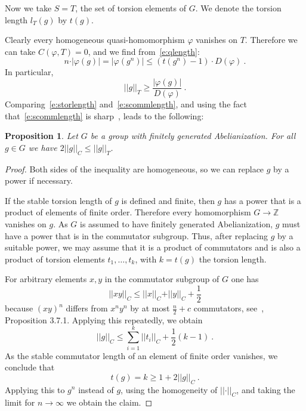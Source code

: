 \documentclass[12pt]{amsart}
\newtheorem{prop}[thm]{Proposition}
\theoremstyle{remark}
\theoremstyle{definition}
\newcommand{\Z}{\mathbb{ Z}}
\begin{document}
Now we take $S=T$, the set of torsion elements of $G$. We 
denote the torsion length $l_{T}(g)$ by $t(g)$.

Clearly every homogeneous quasi-homomorphism $\varphi$ vanishes on $T$. 
Therefore we can take $C(\varphi,T)=0$, and we find 
from~\eqref{e:qlength}:
\begin{equation}\label{e:torlength}
    n\cdot\vert\varphi(g)\vert = \vert\varphi(g^{n})\vert\leq 
    (t(g^{n})-1)\cdot 
    D(\varphi)\ .
    \end{equation}
In particular,
\begin{equation}\label{e:storlength}
   \vert\vert g\vert\vert_{T}
    \geq\frac{\vert\varphi(g)\vert}{D(\varphi)} \ .
    \end{equation}
Comparing~\eqref{e:storlength} and~\eqref{e:scommlength}, and using the 
fact that~\eqref{e:scommlength} is sharp~\cite{B}, leads to the 
following:
\begin{prop}\label{p:tor}
    Let $G$ be a group with finitely generated Abelianization. 
    For all $g\in G$ we have 
    $2\vert\vert g\vert\vert_{C}\leq\vert\vert g\vert\vert_{T}$.
    \end{prop}
\begin{proof}
    Both sides of the inequality are homogeneous, so we can replace 
    $g$ by a power if necessary.
    
    If the stable torsion length of $g$ is defined and finite, then 
    $g$ has a power that is a product of elements of finite order. 
    Therefore every homomorphism $G\rightarrow\Z$ vanishes on $g$.
    As $G$ is assumed to have finitely generated Abelianization,  
    $g$ must have a power that is in the commutator subgroup. Thus, 
    after replacing $g$ by a suitable power, we may assume that it is 
    a product of commutators and is also a product of torsion elements 
    $t_{1},\ldots,t_{k}$, with $k=t(g)$ the torsion length.
    
    For arbitrary elements $x,y$ in the commutator subgroup of $G$ one 
    has 
    $$
    \vert\vert xy\vert\vert_{C}\leq\vert\vert x\vert\vert_{C}+
    \vert\vert y\vert\vert_{C}+\frac{1}{2}
    $$
    because $(xy)^{n}$ differs from $x^{n}y^{n}$ by at most 
    $\frac{n}{2}+c$ commutators, see~\cite{B}, Proposition 3.7.1. 
    Applying this repeatedly, we obtain
    $$
    \vert\vert g\vert\vert_{C}\leq\sum_{i=1}^{k}\vert\vert 
    t_{i}\vert\vert_{C}+\frac{1}{2}(k-1) \ .
    $$
    As the stable commutator length of an element of finite order 
    vanishes, we conclude that
    $$
    t(g)=k\geq 1+2\vert\vert g\vert\vert_{C} \ .
    $$
    Applying this to $g^{n}$ instead of $g$, using the homogeneity of 
    $\vert\vert\cdot\vert\vert_{C}$, and taking the limit for 
    $n\rightarrow\infty$ we obtain the claim.
    \end{proof}
\end{document}
